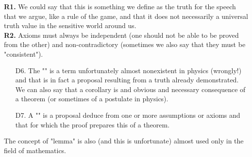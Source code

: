 	\begin{tcolorbox}[title=Remarks,colframe=black,arc=10pt]
	\textbf{R1.} We could say that this is something we define as the truth for the speech that we argue, like a rule of the game, and that it does not necessarily a universal truth value in the sensitive world around us.\\

	\textbf{R2.} Axioms must always be independent (one should not be able to be proved from the other) and non-contradictory (sometimes we also say that they must be "consistent"). 
	\end{tcolorbox}	
	
\begin{itemize}
	\item[D6.] The "" is a term unfortunately almost nonexistent in physics (wrongly!) and that is in fact a proposal resulting from a truth already demonstrated. We can also say that a corollary is and obvious and necessary consequence of a theorem (or sometimes of a postulate in physics). 

	\item[D7.] A "" is a proposal deduce from one or more assumptions or axioms and that for which the proof prepares this of a theorem.
\end{itemize}

	\begin{tcolorbox}[title=Remark,colframe=black,arc=10pt]
The concept of "lemma" is also (and this is unfortunate) almost used only in the field of mathematics. 
	\end{tcolorbox}	

